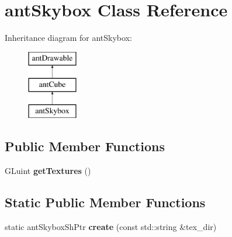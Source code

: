 \hypertarget{classant_skybox}{\section{ant\+Skybox Class Reference}
\label{classant_skybox}
}
Inheritance diagram for ant\+Skybox\+:\begin{figure}[H]
\begin{center}
\leavevmode
\includegraphics[height=3.000000cm]{classant_skybox}
\end{center}
\end{figure}
\subsection*{Public Member Functions}
\begin{DoxyCompactItemize}
\item 
\hypertarget{classant_skybox_a1832fdcc8a7dbed2da0c8a6b4b10dc6a}{G\+Luint {\bfseries get\+Textures} ()}\label{classant_skybox_a1832fdcc8a7dbed2da0c8a6b4b10dc6a}

\end{DoxyCompactItemize}
\subsection*{Static Public Member Functions}
\begin{DoxyCompactItemize}
\item 
\hypertarget{classant_skybox_a2e4c67b009ae90b0a3fd26b5784b8e9f}{static ant\+Skybox\+Sh\+Ptr {\bfseries create} (const std\+::string \&tex\+\_\+dir)}\label{classant_skybox_a2e4c67b009ae90b0a3fd26b5784b8e9f}

\end{DoxyCompactItemize}
